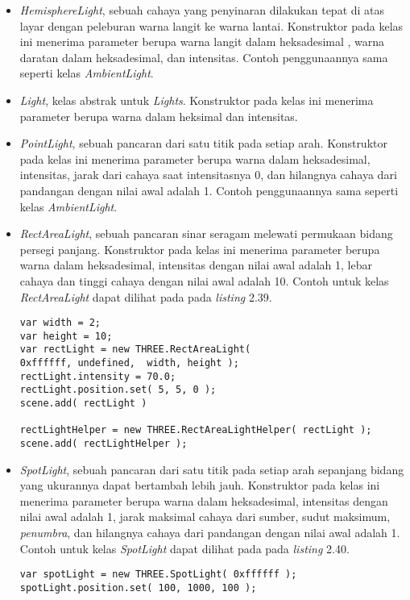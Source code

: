 \begin{itemize}
\begin{itemize}
	\item {\it HemisphereLight}, sebuah cahaya yang penyinaran dilakukan tepat di atas layar dengan peleburan warna langit ke warna lantai. Konstruktor pada kelas ini menerima parameter berupa warna langit dalam heksadesimal , warna daratan dalam heksadesimal, dan intensitas. Contoh penggunaannya sama seperti kelas {\it AmbientLight}.
	
	\item {\it Light}, kelas abstrak untuk {\it Lights}. Konstruktor pada kelas ini menerima parameter berupa warna dalam heksimal dan intensitas.

	\item {\it PointLight}, sebuah pancaran dari satu titik pada setiap arah. Konstruktor pada kelas ini menerima parameter berupa warna dalam heksadesimal, intensitas, jarak dari cahaya saat intensitasnya 0, dan hilangnya cahaya dari pandangan dengan nilai awal adalah 1. Contoh penggunaannya sama seperti kelas {\it AmbientLight}.
	
	\item {\it RectAreaLight}, sebuah pancaran sinar seragam melewati permukaan bidang persegi panjang. Konstruktor pada kelas ini menerima parameter berupa warna dalam heksadesimal, intensitas dengan nilai awal adalah 1, lebar cahaya dan tinggi cahaya dengan nilai awal adalah 10. Contoh untuk kelas {\it RectAreaLight} dapat dilihat pada pada {\it listing} 2.39.
	
\begin{lstlisting}[caption={Contoh penggunaan kelas {\it RectAreaLight}.},captionpos=b]
var width = 2;
var height = 10;
var rectLight = new THREE.RectAreaLight(
0xffffff, undefined,  width, height );
rectLight.intensity = 70.0;
rectLight.position.set( 5, 5, 0 );
scene.add( rectLight )

rectLightHelper = new THREE.RectAreaLightHelper( rectLight );
scene.add( rectLightHelper );
\end{lstlisting}

	\item {\it SpotLight}, sebuah pancaran dari satu titik pada setiap arah sepanjang bidang yang ukurannya dapat bertambah lebih jauh. Konstruktor pada kelas ini menerima parameter berupa warna dalam heksadesimal, intensitas dengan nilai awal adalah 1, jarak maksimal cahaya dari sumber, sudut maksimum, {\it penumbra}, dan hilangnya cahaya dari pandangan dengan nilai awal adalah 1. Contoh untuk kelas {\it SpotLight} dapat dilihat pada pada {\it listing} 2.40.
	
\begin{lstlisting}[caption={Contoh penggunaan kelas {\it SpotLight}.},captionpos=b]
var spotLight = new THREE.SpotLight( 0xffffff );
spotLight.position.set( 100, 1000, 100 );


\end{lstlisting}
\end{itemize}
\end{itemize}
